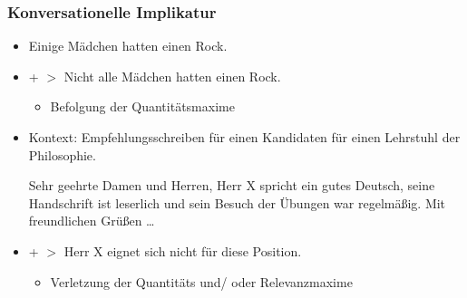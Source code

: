 \begin{frame}
\frametitle{Konversationelle Implikatur}

\begin{itemize}
	\item[]

	\ea Einige Mädchen hatten einen Rock.
	\z

	\item[] + $>$ Nicht alle Mädchen hatten einen Rock.
	
	\begin{itemize}
		\item Befolgung der Quantitätsmaxime
	\end{itemize}

\vspace{5mm}

	\item Kontext: Empfehlungsschreiben für einen Kandidaten für einen Lehrstuhl der Philosophie.

	\ea Sehr geehrte Damen und Herren, Herr X spricht ein gutes Deutsch, seine Handschrift ist leserlich und sein Besuch der Übungen war regelmä\ss{}ig. Mit freundlichen Grü\ss{}en \dots
	\z
	
	\item[] + $>$ Herr X eignet sich nicht für diese Position.

	\begin{itemize}
		\item Verletzung der Quantitäts und/ oder Relevanzmaxime
	\end{itemize}
	
\end{itemize}

\end{frame}



